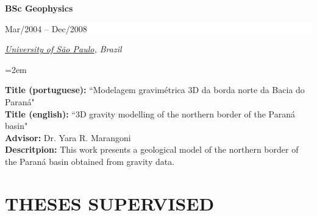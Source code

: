 \documentclass[paper=letter,fontsize=11pt]{scrartcl} %
\newcommand{\sepspace}{\vspace*{1em}}		%
\newcommand{\NewPart}[2]{\section*{\uppercase{#1} #2}}
\newcommand{\EducationEntry}[4]{
		\noindent \textbf{#1} \hfill      %
		\colorbox{White}{%
			\parbox{10em}{%
			\hfill\color{Black}#2}} \par  %
		\noindent \textit{#3} \par        %
		\noindent\hangindent=2em\hangafter=0 \small #4 %
		\normalsize \par}
\begin{document}
\sepspace

\EducationEntry{\Large BSc Geophysics}{\begin{flushright} Mar/2004 -- Dec/2008 \end{flushright} \vspace{-0.2in}}{\href{http://www.iag.usp.br/international/}{University of S\~{a}o Paulo}, Brazil}

\sepspace \noindent
\textbf{Title (portuguese):} ``Modelagem gravim\'{e}trica 3D da borda norte da Bacia do Paran\'{a}" \\
\textbf{Title (english):} ``3D gravity modelling of the northern border of the Paran\'{a} basin" \\
\textbf{Advisor:} Dr. Yara R. Marangoni \\
\textbf{Descritpion:} This work presents a geological model of the northern border of the Paran\'{a} basin obtained from gravity data.

\sepspace


\renewcommand{\refname}{PEER-REVIEWED JOURNAL PAPERS (\href{http://orcid.org/0000-0002-6338-4086}{ORCID})}




\renewcommand{\refname}{LAST PARTICIPATIONS AT INTERNATIONAL CONFERENCES}



\NewPart{Theses Supervised}{}
\end{document}
